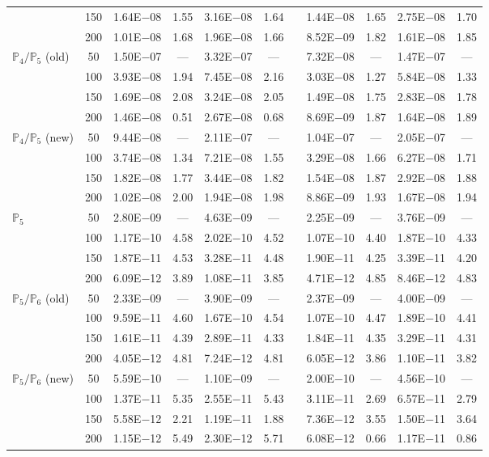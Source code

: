 \begin{table}[H]
{\begin{tabular}{@{}l c c c c c c c c c c@{}}
 & 150 & 1.64E$-$08 & 1.55  & 3.16E$-$08 & 1.64 &  & 1.44E$-$08 & 1.65 & 2.75E$-$08 & 1.70\\
 & 200 & 1.01E$-$08 & 1.68  & 1.96E$-$08 & 1.66 &  & 8.52E$-$09 & 1.82 & 1.61E$-$08 & 1.85\\
\midrule
\multirow{4}{*}{$\mathbb{P}_{4}/\mathbb{P}_{5}$ (old)}
 & 50 & 1.50E$-$07 & ---  & 3.32E$-$07 & --- &  & 7.32E$-$08 & --- & 1.47E$-$07 & ---\\
 & 100 & 3.93E$-$08 & 1.94  & 7.45E$-$08 & 2.16 &  & 3.03E$-$08 & 1.27 & 5.84E$-$08 & 1.33\\
 & 150 & 1.69E$-$08 & 2.08  & 3.24E$-$08 & 2.05 &  & 1.49E$-$08 & 1.75 & 2.83E$-$08 & 1.78\\
 & 200 & 1.46E$-$08 & 0.51  & 2.67E$-$08 & 0.68 &  & 8.69E$-$09 & 1.87 & 1.64E$-$08 & 1.89\\
\midrule
\multirow{4}{*}{$\mathbb{P}_{4}/\mathbb{P}_{5}$ (new)}
 & 50 & 9.44E$-$08 & ---  & 2.11E$-$07 & --- &  & 1.04E$-$07 & --- & 2.05E$-$07 & ---\\
 & 100 & 3.74E$-$08 & 1.34  & 7.21E$-$08 & 1.55 &  & 3.29E$-$08 & 1.66 & 6.27E$-$08 & 1.71\\
 & 150 & 1.82E$-$08 & 1.77  & 3.44E$-$08 & 1.82 &  & 1.54E$-$08 & 1.87 & 2.92E$-$08 & 1.88\\
 & 200 & 1.02E$-$08 & 2.00  & 1.94E$-$08 & 1.98 &  & 8.86E$-$09 & 1.93 & 1.67E$-$08 & 1.94\\
\midrule
\multirow{4}{*}{$\mathbb{P}_{5}$}
 & 50 & 2.80E$-$09 & ---  & 4.63E$-$09 & --- &  & 2.25E$-$09 & --- & 3.76E$-$09 & ---\\
 & 100 & 1.17E$-$10 & 4.58  & 2.02E$-$10 & 4.52 &  & 1.07E$-$10 & 4.40 & 1.87E$-$10 & 4.33\\
 & 150 & 1.87E$-$11 & 4.53  & 3.28E$-$11 & 4.48 &  & 1.90E$-$11 & 4.25 & 3.39E$-$11 & 4.20\\
 & 200 & 6.09E$-$12 & 3.89  & 1.08E$-$11 & 3.85 &  & 4.71E$-$12 & 4.85 & 8.46E$-$12 & 4.83\\
\midrule
\multirow{4}{*}{$\mathbb{P}_{5}/\mathbb{P}_{6}$ (old)}
 & 50 & 2.33E$-$09 & ---  & 3.90E$-$09 & --- &  & 2.37E$-$09 & --- & 4.00E$-$09 & ---\\
 & 100 & 9.59E$-$11 & 4.60  & 1.67E$-$10 & 4.54 &  & 1.07E$-$10 & 4.47 & 1.89E$-$10 & 4.41\\
 & 150 & 1.61E$-$11 & 4.39  & 2.89E$-$11 & 4.33 &  & 1.84E$-$11 & 4.35 & 3.29E$-$11 & 4.31\\
 & 200 & 4.05E$-$12 & 4.81  & 7.24E$-$12 & 4.81 &  & 6.05E$-$12 & 3.86 & 1.10E$-$11 & 3.82\\
\midrule
\multirow{4}{*}{$\mathbb{P}_{5}/\mathbb{P}_{6}$ (new)}
 & 50 & 5.59E$-$10 & ---  & 1.10E$-$09 & --- &  & 2.00E$-$10 & --- & 4.56E$-$10 & ---\\
 & 100 & 1.37E$-$11 & 5.35  & 2.55E$-$11 & 5.43 &  & 3.11E$-$11 & 2.69 & 6.57E$-$11 & 2.79\\
 & 150 & 5.58E$-$12 & 2.21  & 1.19E$-$11 & 1.88 &  & 7.36E$-$12 & 3.55 & 1.50E$-$11 & 3.64\\
 & 200 & 1.15E$-$12 & 5.49  & 2.30E$-$12 & 5.71 &  & 6.08E$-$12 & 0.66 & 1.17E$-$11 & 0.86\\
\bottomrule
\end{tabular}}
\label{none}
\end{table}
